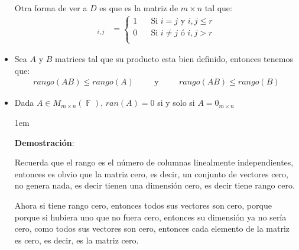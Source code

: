 \documentclass[12pt, fleqn]{report}                             %
\newenvironment{SmallIndentation}[1][0.75em]                    %
        {\begin{adjustwidth}{#1}{}\begin{footnotesize}}             %
        {\end{footnotesize}\end{adjustwidth}}                       %
\DeclareMathOperator \Space {\quad}                             %
\DeclareMathOperator \MiniSpace {\;}                            %
\newcommand \Also {\MiniSpace \text{y} \MiniSpace}              %
\theoremstyle{break}                                            %
\DeclareMathOperator \GenericField {\mathbb{F}}                 %
\begin{document}
\begin{itemize}
                        Otra forma de ver a $D$ es que es la matriz de $m \times n$
                        tal que:
                        \begin{align*}
                            [D]_{i, j}
                                &= 
                                \begin{cases}
                                    1 \Space \text{Si $i = j$ y $i, j \leq r$}   \\
                                    0 \Space \text{Si $i \neq j$ ó $i, j > r$}   \\
                                \end{cases}
                        \end{align*}

                    \clearpage

                    \item
                        Sea $A$ y $B$ matrices tal que su producto esta bien definido,
                        entonces tenemos que:
                        \begin{align*}
                            rango(AB) \leq rango(A)
                            \Space
                            \Also
                            \Space
                            rango(AB) \leq rango(B)
                        \end{align*}

                    \item
                        Dada $A \in M_{m \times n}(\GenericField)$, $ran(A) = 0$ si y solo si $A = 0_{m \times n}$

                        \begin{SmallIndentation}[1em]
                            \textbf{Demostración}:
                            
                            Recuerda que el rango es el número de columnas linealmente independientes, entonces
                            es obvio que la matriz cero, es decir, un conjunto de vectores cero, no genera nada, es decir
                            tienen una dimensión cero, es decir tiene rango cero.

                            Ahora si tiene rango cero, entonces todos sus vectores son cero, porque porque si hubiera uno que no
                            fuera cero, entonces su dimensión ya no sería cero, como todos sus vectores son cero, entonces
                            cada elemento de la matriz es cero, es decir, es la matriz cero.
                        
                        \end{SmallIndentation}

                \end{itemize}
\end{document}
